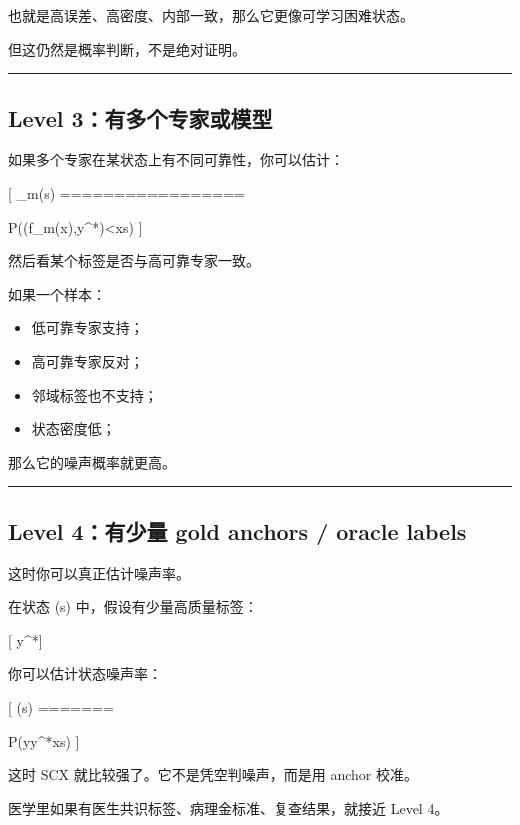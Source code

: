 \documentclass[
  12pt,
]{ctexart}
\providecommand{\tightlist}{%
  \setlength{\itemsep}{0pt}\setlength{\parskip}{0pt}}
\begin{document}
也就是高误差、高密度、内部一致，那么它更像可学习困难状态。

但这仍然是概率判断，不是绝对证明。

\begin{center}\rule{0.5\linewidth}{0.5pt}\end{center}

\subsection{Level
3：有多个专家或模型}\label{level-3ux6709ux591aux4e2aux4e13ux5bb6ux6216ux6a21ux578b}

如果多个专家在某状态上有不同可靠性，你可以估计：

{[} \_m(s) =================

P(\ell(f\_m(x),y\^{}*)\textless{}\tau\mid x\in s) {]}

然后看某个标签是否与高可靠专家一致。

如果一个样本：

\begin{itemize}
\tightlist
\item
  低可靠专家支持；
\item
  高可靠专家反对；
\item
  邻域标签也不支持；
\item
  状态密度低；
\end{itemize}

那么它的噪声概率就更高。

\begin{center}\rule{0.5\linewidth}{0.5pt}\end{center}

\subsection{Level 4：有少量 gold anchors / oracle
labels}\label{level-4ux6709ux5c11ux91cf-gold-anchors-oracle-labels}

这时你可以真正估计噪声率。

在状态 (s) 中，假设有少量高质量标签：

{[} y\^{}*{]}

你可以估计状态噪声率：

{[} \eta(s) =======

P(y\neq y\^{}*\mid x\in s) {]}

这时 SCX 就比较强了。它不是凭空判噪声，而是用 anchor 校准。

医学里如果有医生共识标签、病理金标准、复查结果，就接近 Level 4。
\end{document}
